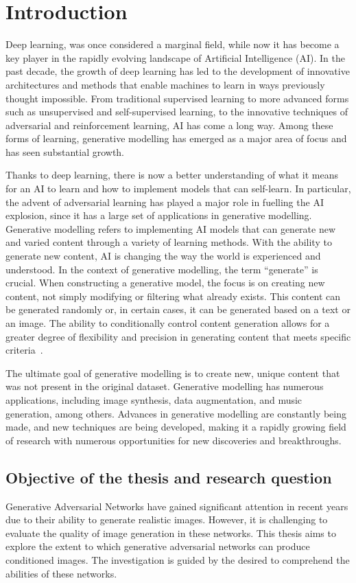 \section{Introduction}
\label{section:IntroductionChapter}
Deep learning, was once considered a marginal field, while now it has become a key player in the rapidly evolving landscape of Artificial Intelligence (AI). In the past decade, the growth of deep learning has led to the development of innovative architectures and methods that enable machines to learn in ways previously thought impossible. From traditional supervised learning to more advanced forms such as unsupervised and self-supervised learning, to the innovative techniques of adversarial and reinforcement learning, AI has come a long way. 
Among these forms of learning, generative modelling has emerged as a major area of focus and has seen substantial growth. 

\noindent Thanks to deep learning, there is now a better understanding of what it means for an AI to learn and how to implement models that can self-learn. 
In particular, the advent of adversarial learning has played a major role in fuelling the AI explosion, since it has a large set of applications in generative modelling. 
Generative modelling refers to implementing AI models that can generate new and varied content through a variety of learning methods. With the ability to generate new content, AI is changing the way the world is experienced and understood. In the context of generative modelling, the term “generate” is crucial. When constructing a generative model, the focus is on creating new content, not simply modifying or filtering what already exists. 
This content can be generated randomly or, in certain cases, it can be generated based on a text or an image. The ability to conditionally control content generation allows for a greater degree of flexibility and precision in generating content that meets specific criteria~\cite{GeneratingNewRealityBook}.

\noindent The ultimate goal of generative modelling is to create new, unique content that was not present in the original dataset. Generative modelling has numerous applications, including image synthesis, data augmentation, and music generation, among others. Advances in generative modelling are constantly being made, and new techniques are being developed, making it a rapidly growing field of research with numerous opportunities for new discoveries and breakthroughs.

\subsection{Objective of the thesis and research question}
Generative Adversarial Networks have gained significant attention in recent years due to their ability to generate realistic images. However, it is challenging to evaluate the quality of image generation in these networks. This thesis aims to explore the extent to which generative adversarial networks can produce conditioned images. The investigation is guided by the desired to comprehend the abilities of these networks.

